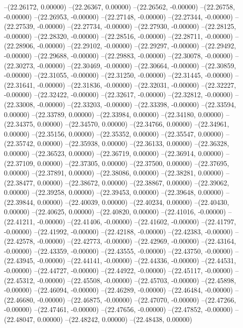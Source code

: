 --(22.26172, 0.00000)
--(22.26367, 0.00000)
--(22.26562, -0.00000)
--(22.26758, -0.00000)
--(22.26953, -0.00000)
--(22.27148, -0.00000)
--(22.27344, -0.00000)
--(22.27539, -0.00000)
--(22.27734, -0.00000)
--(22.27930, -0.00000)
--(22.28125, -0.00000)
--(22.28320, -0.00000)
--(22.28516, -0.00000)
--(22.28711, -0.00000)
--(22.28906, -0.00000)
--(22.29102, -0.00000)
--(22.29297, -0.00000)
--(22.29492, -0.00000)
--(22.29688, -0.00000)
--(22.29883, -0.00000)
--(22.30078, -0.00000)
--(22.30273, -0.00000)
--(22.30469, -0.00000)
--(22.30664, -0.00000)
--(22.30859, -0.00000)
--(22.31055, -0.00000)
--(22.31250, -0.00000)
--(22.31445, -0.00000)
--(22.31641, -0.00000)
--(22.31836, -0.00000)
--(22.32031, -0.00000)
--(22.32227, -0.00000)
--(22.32422, -0.00000)
--(22.32617, -0.00000)
--(22.32812, -0.00000)
--(22.33008, -0.00000)
--(22.33203, -0.00000)
--(22.33398, -0.00000)
--(22.33594, 0.00000)
--(22.33789, 0.00000)
--(22.33984, 0.00000)
--(22.34180, 0.00000)
--(22.34375, 0.00000)
--(22.34570, 0.00000)
--(22.34766, 0.00000)
--(22.34961, 0.00000)
--(22.35156, 0.00000)
--(22.35352, 0.00000)
--(22.35547, 0.00000)
--(22.35742, 0.00000)
--(22.35938, 0.00000)
--(22.36133, 0.00000)
--(22.36328, 0.00000)
--(22.36523, 0.00000)
--(22.36719, 0.00000)
--(22.36914, 0.00000)
--(22.37109, 0.00000)
--(22.37305, 0.00000)
--(22.37500, 0.00000)
--(22.37695, 0.00000)
--(22.37891, 0.00000)
--(22.38086, 0.00000)
--(22.38281, 0.00000)
--(22.38477, 0.00000)
--(22.38672, 0.00000)
--(22.38867, 0.00000)
--(22.39062, 0.00000)
--(22.39258, 0.00000)
--(22.39453, 0.00000)
--(22.39648, 0.00000)
--(22.39844, 0.00000)
--(22.40039, 0.00000)
--(22.40234, 0.00000)
--(22.40430, 0.00000)
--(22.40625, 0.00000)
--(22.40820, 0.00000)
--(22.41016, -0.00000)
--(22.41211, -0.00000)
--(22.41406, -0.00000)
--(22.41602, -0.00000)
--(22.41797, -0.00000)
--(22.41992, -0.00000)
--(22.42188, -0.00000)
--(22.42383, -0.00000)
--(22.42578, -0.00000)
--(22.42773, -0.00000)
--(22.42969, -0.00000)
--(22.43164, -0.00000)
--(22.43359, -0.00000)
--(22.43555, -0.00000)
--(22.43750, -0.00000)
--(22.43945, -0.00000)
--(22.44141, -0.00000)
--(22.44336, -0.00000)
--(22.44531, -0.00000)
--(22.44727, -0.00000)
--(22.44922, -0.00000)
--(22.45117, -0.00000)
--(22.45312, -0.00000)
--(22.45508, -0.00000)
--(22.45703, -0.00000)
--(22.45898, -0.00000)
--(22.46094, -0.00000)
--(22.46289, -0.00000)
--(22.46484, -0.00000)
--(22.46680, -0.00000)
--(22.46875, -0.00000)
--(22.47070, -0.00000)
--(22.47266, -0.00000)
--(22.47461, -0.00000)
--(22.47656, -0.00000)
--(22.47852, -0.00000)
--(22.48047, 0.00000)
--(22.48242, 0.00000)
--(22.48438, 0.00000)
